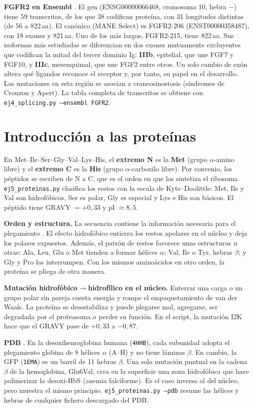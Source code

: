 \documentclass[11pt,a4paper]{article}
\newcommand{\sq}[1]{\texttt{#1}}
\begin{document}
\textbf{FGFR2 en Ensembl} \cite{ensembl}. El gen (ENSG00000066468, cromosoma 10, hebra $-$) tiene 59 transcritos, de los que 38 codifican proteína, con 31 longitudes distintas (de 56 a 822\,aa). El canónico (MANE Select) es FGFR2-206 (ENST00000358487), con 18 exones y 821\,aa. Uno de los más largos, FGFR2-215, tiene 822\,aa. Sus isoformas más estudiadas se diferencian en dos exones mutuamente excluyentes que codifican la mitad del tercer dominio Ig: \textbf{IIIb}, epitelial, que une FGF7 y FGF10, y \textbf{IIIc}, mesenquimal, que une FGF2 entre otros. Un solo cambio de exón altera qué ligandos reconoce el receptor y, por tanto, su papel en el desarrollo. Las mutaciones en esta región se asocian a craneosinostosis (síndromes de Crouzon y Apert). La tabla completa de transcritos se obtiene con \sq{ej4\_splicing.py --ensembl FGFR2}.

\section{Introducción a las proteínas}
En Met--Ile--Ser--Gly--Val--Lys--His, el \textbf{extremo N} es la \textbf{Met} (grupo $\alpha$-amino libre) y el \textbf{extremo C} es la \textbf{His} (grupo $\alpha$-carboxilo libre). Por convenio, los péptidos se escriben de N a C, que es el orden en que los sintetiza el ribosoma. \sq{ej5\_proteinas.py} clasifica los restos con la escala de Kyte--Doolittle: Met, Ile y Val son hidrofóbicos, Ser es polar, Gly es especial y Lys e His son básicos. El péptido tiene GRAVY $=+0{,}33$ y pI $\approx 8{,}5$.

\textbf{Orden y estructura.} La secuencia contiene la información necesaria para el plegamiento \cite{anfinsen}. El efecto hidrofóbico entierra los restos apolares en el núcleo y deja los polares expuestos. Además, el patrón de restos favorece unas estructuras u otras: Ala, Leu, Glu o Met tienden a formar hélices $\alpha$; Val, Ile o Tyr, hebras $\beta$; y Gly y Pro las interrumpen. Con los mismos aminoácidos en otro orden, la proteína se pliega de otra manera.

\textbf{Mutación hidrofóbico$\to$hidrofílico en el núcleo.} Enterrar una carga o un grupo polar sin pareja cuesta energía y rompe el empaquetamiento de van der Waals. La proteína se desestabiliza y puede plegarse mal, agregarse, ser degradada por el proteasoma o perder su función. En el script, la mutación I2K hace que el GRAVY pase de $+0{,}33$ a $-0{,}87$.

\textbf{PDB} \cite{pdb}. En la desoxihemoglobina humana (\sq{4HHB}), cada subunidad adopta el plegamiento globina de 8 hélices $\alpha$ (A--H) y no tiene láminas $\beta$. En cambio, la GFP (\sq{1EMA}) es un barril de 11 hebras $\beta$. Una sola mutación puntual en la cadena $\beta$ de la hemoglobina, Glu6Val, crea en la superficie una zona hidrofóbica que hace polimerizar la desoxi-HbS (anemia falciforme). Es el caso inverso al del núcleo, pero muestra el mismo principio. \sq{ej5\_proteinas.py --pdb} resume las hélices y hebras de cualquier fichero descargado del PDB.
\end{document}
